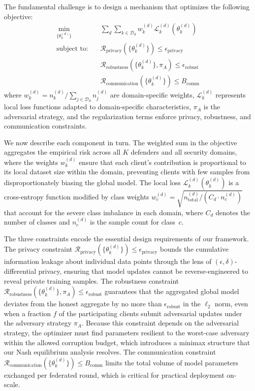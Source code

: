 \documentclass[12pt,a4paper]{article}
\theoremstyle{definition}
\newcommand{\D}{\mathcal{D}}
\begin{document}
The fundamental challenge is to design a mechanism that optimizes the following objective:
\begin{align}
\min_{\{\theta_k^{(d)}\}} \quad & \sum_{d} \sum_{k \in \D_d} w_k^{(d)} \mathcal{L}_k^{(d)}(\theta_k^{(d)}) \label{eq:main_objective}\\
\text{subject to:} \quad & \mathcal{R}_{\text{privacy}}(\{\theta_k^{(d)}\}) \leq \epsilon_{\text{privacy}} \nonumber \\
& \mathcal{R}_{\text{robustness}}(\{\theta_k^{(d)}\}, \pi_A) \leq \epsilon_{\text{robust}} \nonumber \\
& \mathcal{R}_{\text{communication}}(\{\theta_k^{(d)}\}) \leq B_{\text{comm}} \nonumber
\end{align}
where $w_k^{(d)} = n_k^{(d)}/\sum_{j \in \D_d} n_j^{(d)}$ are domain-specific weights, $\mathcal{L}_k^{(d)}$ represents local loss functions adapted to domain-specific characteristics, $\pi_A$ is the adversarial strategy, and the regularization terms enforce privacy, robustness, and communication constraints.

We now describe each component in turn. The weighted sum in the objective aggregates the empirical risk across all $K$ defenders and all security domains, where the weights $w_k^{(d)}$ ensure that each client's contribution is proportional to its local dataset size within the domain, preventing clients with few samples from disproportionately biasing the global model. The local loss $\mathcal{L}_k^{(d)}(\theta_k^{(d)})$ is a cross-entropy function modified by class weights $w_c^{(d)} = \sqrt{n_{\text{total}}^{(d)} / (C_d \cdot n_c^{(d)})}$ that account for the severe class imbalance in each domain, where $C_d$ denotes the number of classes and $n_c^{(d)}$ is the sample count for class~$c$.

The three constraints encode the essential design requirements of our framework. The privacy constraint $\mathcal{R}_{\text{privacy}}(\{\theta_k^{(d)}\}) \leq \epsilon_{\text{privacy}}$ bounds the cumulative information leakage about individual data points through the lens of $(\epsilon,\delta)$-differential privacy, ensuring that model updates cannot be reverse-engineered to reveal private training samples. The robustness constraint $\mathcal{R}_{\text{robustness}}(\{\theta_k^{(d)}\}, \pi_A) \leq \epsilon_{\text{robust}}$ guarantees that the aggregated global model deviates from the honest aggregate by no more than $\epsilon_{\text{robust}}$ in the $\ell_2$ norm, even when a fraction $f$ of the participating clients submit adversarial updates under the adversary strategy $\pi_A$. Because this constraint depends on the adversarial strategy, the optimizer must find parameters resilient to the worst-case adversary within the allowed corruption budget, which introduces a minimax structure that our Nash equilibrium analysis resolves. The communication constraint $\mathcal{R}_{\text{communication}}(\{\theta_k^{(d)}\}) \leq B_{\text{comm}}$ limits the total volume of model parameters exchanged per federated round, which is critical for practical deployment on-scale.
\end{document}
